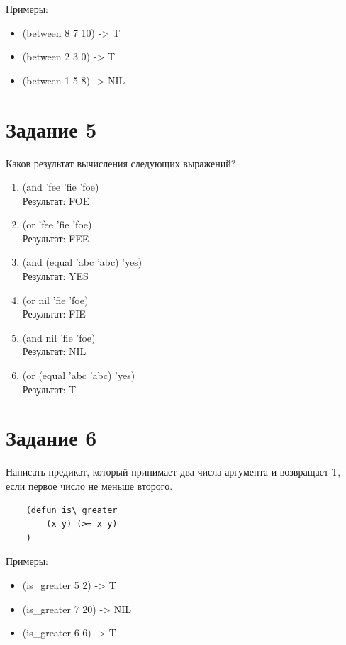 \documentclass[a4paper, 12pt]{article}
\begin{document}
Примеры:
\begin{itemize}
	\item (between 8 7 10) -> T
	\item (between 2 3 0) -> T
	\item (between 1 5 8) -> NIL\\
\end{itemize}

\section*{Задание 5}
Каков результат вычисления следующих выражений?\\
\begin{enumerate}
	\item (and 'fee 'fie 'foe)\\
	Результат: FOE
	\item (or 'fee 'fie 'foe)\\
	Результат: FEE
	\item (and (equal 'abc 'abc) 'yes)\\
	Результат: YES
	\item (or nil 'fie 'foe)\\
	Результат: FIE
	\item (and nil 'fie 'foe)\\
	Результат: NIL
	\item (or (equal 'abc 'abc) 'yes)\\
	Результат: T\\
\end{enumerate}

\section*{Задание 6}
Написать предикат, который принимает два числа-аргумента и возвращает Т, если первое число не меньше второго.\\
\begin{lstlisting}
	(defun is\_greater 
		(x y) (>= x y)
	)
\end{lstlisting}

Примеры:
\begin{itemize}
	\item (is\_greater 5 2) -> T
	\item (is\_greater 7 20) -> NIL
	\item (is\_greater 6 6) -> T\\
\end{itemize}
\end{document}
